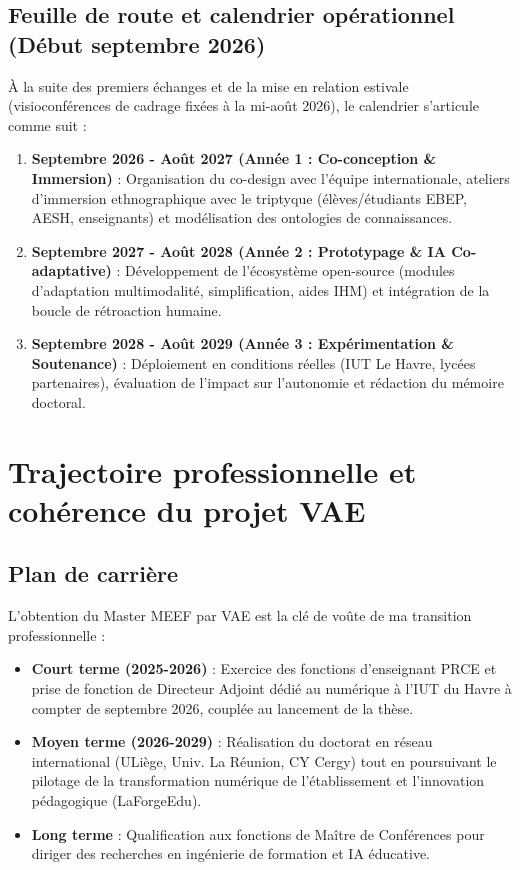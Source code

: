 \subsection{Feuille de route et calendrier opérationnel (Début septembre 2026)}

À la suite des premiers échanges et de la mise en relation estivale (visioconférences de cadrage fixées à la mi-août 2026), le calendrier s'articule comme suit :
\begin{enumerate}[leftmargin=*]
    \item \textbf{Septembre 2026 - Août 2027 (Année 1 : Co-conception \& Immersion)} : Organisation du co-design avec l'équipe internationale, ateliers d'immersion ethnographique avec le triptyque (élèves/étudiants EBEP, AESH, enseignants) et modélisation des ontologies de connaissances.
    \item \textbf{Septembre 2027 - Août 2028 (Année 2 : Prototypage \& IA Co-adaptative)} : Développement de l'écosystème open-source (modules d'adaptation multimodalité, simplification, aides IHM) et intégration de la boucle de rétroaction humaine.
    \item \textbf{Septembre 2028 - Août 2029 (Année 3 : Expérimentation \& Soutenance)} : Déploiement en conditions réelles (IUT Le Havre, lycées partenaires), évaluation de l'impact sur l'autonomie et rédaction du mémoire doctoral.
\end{enumerate}

\section{Trajectoire professionnelle et cohérence du projet VAE}

\subsection{Plan de carrière}

L'obtention du Master MEEF par VAE est la clé de voûte de ma transition professionnelle :
\begin{itemize}[leftmargin=*]
    \item \textbf{Court terme (2025-2026)} : Exercice des fonctions d'enseignant PRCE et prise de fonction de Directeur Adjoint dédié au numérique à l'IUT du Havre à compter de septembre 2026, couplée au lancement de la thèse.
    \item \textbf{Moyen terme (2026-2029)} : Réalisation du doctorat en réseau international (ULiège, Univ. La Réunion, CY Cergy) tout en poursuivant le pilotage de la transformation numérique de l'établissement et l'innovation pédagogique (LaForgeEdu).
    \item \textbf{Long terme} : Qualification aux fonctions de Maître de Conférences pour diriger des recherches en ingénierie de formation et IA éducative.
\end{itemize}

